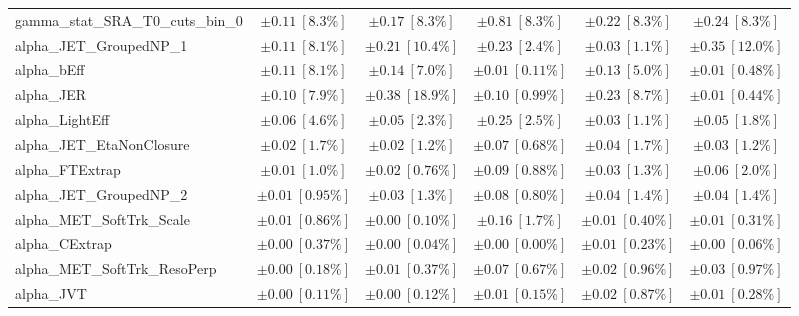 \begin{sidewaystable}
\begin{center}
\begin{tabular*}{\textwidth}{@{\extracolsep{\fill}}lccccc}
gamma\_stat\_SRA\_T0\_cuts\_bin\_0         & $\pm 0.11\ [8.3\%] $          & $\pm 0.17\ [8.3\%] $          & $\pm 0.81\ [8.3\%] $          & $\pm 0.22\ [8.3\%] $          & $\pm 0.24\ [8.3\%] $       \\
alpha\_JET\_GroupedNP\_1         & $\pm 0.11\ [8.1\%] $          & $\pm 0.21\ [10.4\%] $          & $\pm 0.23\ [2.4\%] $          & $\pm 0.03\ [1.1\%] $          & $\pm 0.35\ [12.0\%] $       \\
alpha\_bEff         & $\pm 0.11\ [8.1\%] $          & $\pm 0.14\ [7.0\%] $          & $\pm 0.01\ [0.11\%] $          & $\pm 0.13\ [5.0\%] $          & $\pm 0.01\ [0.48\%] $       \\
alpha\_JER         & $\pm 0.10\ [7.9\%] $          & $\pm 0.38\ [18.9\%] $          & $\pm 0.10\ [0.99\%] $          & $\pm 0.23\ [8.7\%] $          & $\pm 0.01\ [0.44\%] $       \\
alpha\_LightEff         & $\pm 0.06\ [4.6\%] $          & $\pm 0.05\ [2.3\%] $          & $\pm 0.25\ [2.5\%] $          & $\pm 0.03\ [1.1\%] $          & $\pm 0.05\ [1.8\%] $       \\
alpha\_JET\_EtaNonClosure         & $\pm 0.02\ [1.7\%] $          & $\pm 0.02\ [1.2\%] $          & $\pm 0.07\ [0.68\%] $          & $\pm 0.04\ [1.7\%] $          & $\pm 0.03\ [1.2\%] $       \\
alpha\_FTExtrap         & $\pm 0.01\ [1.0\%] $          & $\pm 0.02\ [0.76\%] $          & $\pm 0.09\ [0.88\%] $          & $\pm 0.03\ [1.3\%] $          & $\pm 0.06\ [2.0\%] $       \\
alpha\_JET\_GroupedNP\_2         & $\pm 0.01\ [0.95\%] $          & $\pm 0.03\ [1.3\%] $          & $\pm 0.08\ [0.80\%] $          & $\pm 0.04\ [1.4\%] $          & $\pm 0.04\ [1.4\%] $       \\
alpha\_MET\_SoftTrk\_Scale         & $\pm 0.01\ [0.86\%] $          & $\pm 0.00\ [0.10\%] $          & $\pm 0.16\ [1.7\%] $          & $\pm 0.01\ [0.40\%] $          & $\pm 0.01\ [0.31\%] $       \\
alpha\_CExtrap         & $\pm 0.00\ [0.37\%] $          & $\pm 0.00\ [0.04\%] $          & $\pm 0.00\ [0.00\%] $          & $\pm 0.01\ [0.23\%] $          & $\pm 0.00\ [0.06\%] $       \\
alpha\_MET\_SoftTrk\_ResoPerp         & $\pm 0.00\ [0.18\%] $          & $\pm 0.01\ [0.37\%] $          & $\pm 0.07\ [0.67\%] $          & $\pm 0.02\ [0.96\%] $          & $\pm 0.03\ [0.97\%] $       \\
alpha\_JVT         & $\pm 0.00\ [0.11\%] $          & $\pm 0.00\ [0.12\%] $          & $\pm 0.01\ [0.15\%] $          & $\pm 0.02\ [0.87\%] $          & $\pm 0.01\ [0.28\%] $       \\

\end{tabular*}
\end{center}
\end{sidewaystable}
